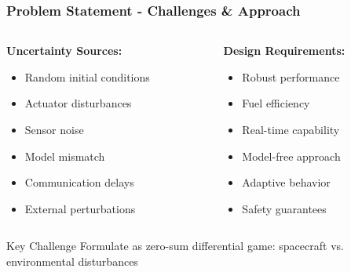 \documentclass[
    11pt, %
    aspectratio=169, %
]{beamer}
\begin{document}
\begin{frame}
    \frametitle{Problem Statement - Challenges \& Approach}
    
    \begin{columns}[T,onlytextwidth]
        \begin{column}{0.45\textwidth}
            \textbf{Uncertainty Sources:}
            \begin{itemize}
                \item Random initial conditions
                \item Actuator disturbances
                \item Sensor noise
                \item Model mismatch
                \item Communication delays
                \item External perturbations
            \end{itemize}
        \end{column}
        \begin{column}{0.55\textwidth}
            \textbf{Design Requirements:}
            \begin{itemize}
                \item Robust performance
                \item Fuel efficiency
                \item Real-time capability
                \item Model-free approach
                \item Adaptive behavior
                \item Safety guarantees
            \end{itemize}
        \end{column}
    \end{columns}
    
    \vspace{-0.1cm}
    \begin{minipage}
        {0.93\textwidth}
            \begin{alertblock}{Key Challenge}
        Formulate as zero-sum differential game: spacecraft vs. environmental disturbances
    \end{alertblock}
    \end{minipage} 

\end{frame}

    
\end{document}
